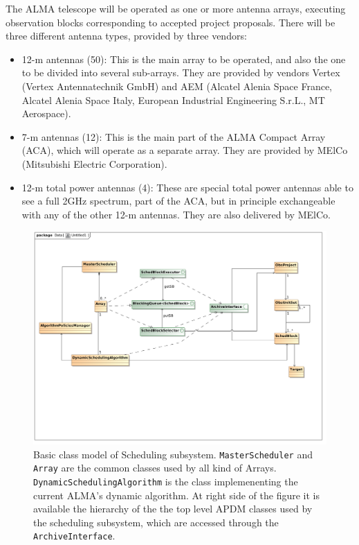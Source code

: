 \documentclass[11pt]{article}
\begin{document}
The ALMA telescope will be operated as one or more antenna arrays, executing observation blocks corresponding to accepted project proposals. There will be three different antenna types, provided by three vendors:
\begin{itemize}
\item 12-m antennas (50): This is the main array to be operated, and also the one to be divided into several sub-arrays. They are provided by vendors Vertex (Vertex Antennatechnik GmbH) and AEM (Alcatel Alenia Space France, Alcatel Alenia Space Italy, European Industrial Engineering S.r.L., MT Aerospace).

\item 7-m antennas (12): This is the main part of the ALMA Compact Array (ACA), which will  operate as a separate array. They are provided by MElCo (Mitsubishi Electric Corporation).

\item 12-m total power antennas (4): These are special total power antennas able to see a full 2GHz spectrum, part of the ACA, but in principle exchangeable with any of the other 12-m antennas. They are also delivered by MElCo.

\end{itemize}

\begin{figure}	
\centering
\includegraphics[width=\textwidth]{images/scheduling_class_model}
\caption{Basic class model of Scheduling subsystem. \texttt{MasterScheduler} and \texttt{Array} are the common classes used by all kind of Arrays. \texttt{DynamicSchedulingAlgorithm} is the class implemenenting the current ALMA's dynamic algorithm. At right side of the figure it is available the hierarchy of the the top level APDM classes used by the scheduling subsystem, which are accessed through the \texttt{ArchiveInterface}. } 
\label{fig:sched-class-model}
\end{figure}
\end{document}
